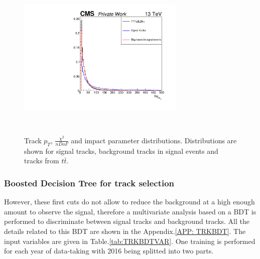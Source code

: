 \documentclass{cernatlasnote}
\begin{document}
\begin{figure}[ht]
        \includegraphics[height=8cm, width=8cm, trim= 0cm 0cm 0cm 0cm,clip]{images/TRK/drSig_TT.pdf}
        \caption{\label{fig:TRKDis} Track $p_T$, $\frac{\chi^2}{nDoF}$ and impact parameter distributions. Distributions are shown for signal tracks, background tracks in signal events and tracks from $t\bar{t}$. }
        \end{figure}

        \FloatBarrier


        \subsubsection{Boosted Decision Tree for track selection}
        However, these first cuts do not allow to reduce the background at a high enough amount to observe the signal, therefore a multivariate analysis based on a BDT is performed to discriminate between signal tracks and background tracks. All the details related to this BDT are shown in the Appendix.\ref{APP: TRKBDT}. The input variables are given in Table.\ref{tab:TRKBDTVAR}. One training is performed for each year of data-taking with 2016 being splitted into two parts. 
\end{document}
